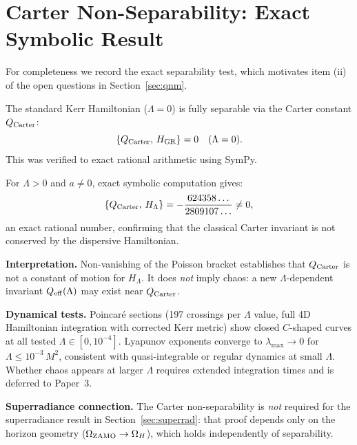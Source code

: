 \documentclass[12pt,a4paper]{article}
\begin{document}
\appendix

\section{Carter Non-Separability: Exact Symbolic Result}
\label{app:carter}

For completeness we record the exact separability test, which motivates
item (ii) of the open questions in Section~\ref{sec:qnm}.

The standard Kerr Hamiltonian ($\Lambda=0$) is fully separable via the
Carter constant $Q_{\rm Carter}$:
\begin{equation}
  \{Q_{\rm Carter},\, H_{\rm GR}\} = 0 \quad (\Lambda = 0).
\end{equation}
This was verified to exact rational arithmetic using SymPy.

For $\Lambda>0$ and $a\neq 0$, exact symbolic computation gives:
\begin{equation}
  \{Q_{\rm Carter},\, H_\Lambda\}
  = -\frac{624358\ldots}{2809107\ldots} \neq 0,
\end{equation}
an exact rational number, confirming that the classical Carter invariant
is not conserved by the dispersive Hamiltonian.

\textbf{Interpretation.}
Non-vanishing of the Poisson bracket establishes that $Q_{\rm Carter}$
is not a constant of motion for $H_\Lambda$. It does \emph{not}
imply chaos: a new $\Lambda$-dependent invariant $Q_{\rm eff}(\Lambda)$
may exist near $Q_{\rm Carter}$.

\textbf{Dynamical tests.}
Poincar\'e sections (197 crossings per $\Lambda$ value, full 4D
Hamiltonian integration with corrected Kerr metric)
show closed $C$-shaped curves at all tested $\Lambda\in[0,10^{-4}]$.
Lyapunov exponents converge to $\lambda_{\max}\to 0$ for
$\Lambda\leq 10^{-3}\,M^2$, consistent with quasi-integrable or
regular dynamics at small $\Lambda$. Whether chaos appears at larger
$\Lambda$ requires extended integration times and is deferred to
Paper~3.

\textbf{Superradiance connection.}
The Carter non-separability is \emph{not} required for the
superradiance result in Section~\ref{sec:superrad}: that proof depends
only on the horizon geometry ($\Omega_{\rm ZAMO}\to\Omega_H$), which
holds independently of separability.
\end{document}
